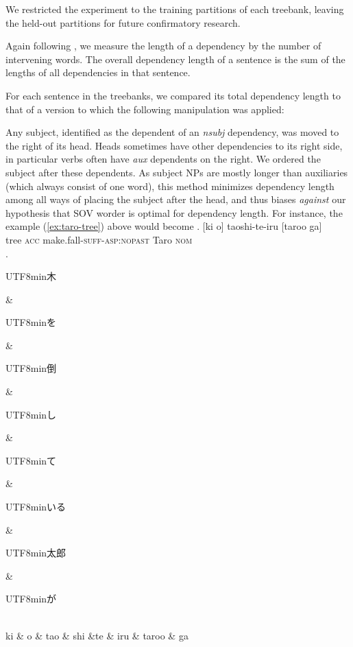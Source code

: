 \documentclass[11pt,a4paper]{article}
\newcommand{\japanese}[1]{\begin{CJK}{UTF8}{min}#1\end{CJK}}
\begin{document}
We restricted the experiment to the training partitions of each treebank, leaving the held-out partitions for future confirmatory research.

Again following \cite{futrell2015largescale}, we measure the length of a dependency by the number of intervening words.
The overall dependency length of a sentence is the sum of the lengths of all dependencies in that sentence.

For each sentence in the treebanks, we compared its total dependency length to that of a version to which the following manipulation was applied:

Any subject, identified as the dependent of an \textit{nsubj} dependency, was moved to the right of its head.
Heads sometimes have other dependencies to its right side, in particular verbs often have \textit{aux} dependents on the right.
We ordered the subject after these dependents.
As subject NPs are mostly longer than auxiliaries (which always consist of one word), this method minimizes dependency length among all ways of placing the subject after the head, and thus biases \emph{against} our hypothesis that SOV worder is optimal for dependency length.
For instance, the example (\ref{ex:taro-tree}) above would become
\exg.  [ki o] taoshi-te-iru [taroo ga] \\
 tree \textsc{acc} make.fall-\textsc{suff}-\textsc{asp:nopast} Taro \textsc{nom}\\

\ex.
\begin{dependency}[theme = simple]
   \begin{deptext}[column sep=1em]
          \japanese{木} \& \japanese{を} \& \japanese{倒} \& \japanese{し} \& \japanese{て} \& \japanese{いる} \&  \japanese{太郎} \& \japanese{が}\\
          ki \& o \& tao \& shi \&te \& iru \& taroo \& ga\\ 
   \end{deptext}
\end{dependency}\label{ex:taro-tree-tree-counter}
\end{document}
